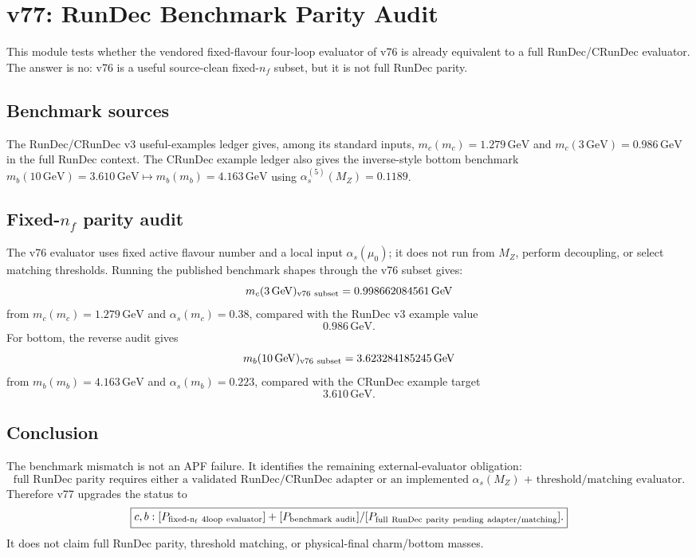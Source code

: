 
\section{v77: RunDec Benchmark Parity Audit}
\label{sec:v77-rundec-benchmark-parity}

This module tests whether the vendored fixed-flavour four-loop evaluator of v76 is already equivalent to a full RunDec/CRunDec evaluator.  The answer is no: v76 is a useful source-clean fixed-$n_f$ subset, but it is not full RunDec parity.

\subsection{Benchmark sources}
The RunDec/CRunDec v3 useful-examples ledger gives, among its standard inputs, $m_c(m_c)=1.279\,\mathrm{GeV}$ and $m_c(3\,\mathrm{GeV})=0.986\,\mathrm{GeV}$ in the full RunDec context.  The CRunDec example ledger also gives the inverse-style bottom benchmark $m_b(10\,\mathrm{GeV})=3.610\,\mathrm{GeV}\mapsto m_b(m_b)=4.163\,\mathrm{GeV}$ using $\alpha_s^{(5)}(M_Z)=0.1189$.

\subsection{Fixed-$n_f$ parity audit}
The v76 evaluator uses fixed active flavour number and a local input $\alpha_s(\mu_0)$; it does not run from $M_Z$, perform decoupling, or select matching thresholds.  Running the published benchmark shapes through the v76 subset gives:
\[
  m_c(3\,\mathrm{GeV})_{\rm v76\ subset}=0.998662084561\,\mathrm{GeV}
\]
from $m_c(m_c)=1.279\,\mathrm{GeV}$ and $\alpha_s(m_c)=0.38$, compared with the RunDec v3 example value
\[
  0.986\,\mathrm{GeV}.
\]
For bottom, the reverse audit gives
\[
  m_b(10\,\mathrm{GeV})_{\rm v76\ subset}=3.623284185245\,\mathrm{GeV}
\]
from $m_b(m_b)=4.163\,\mathrm{GeV}$ and $\alpha_s(m_b)=0.223$, compared with the CRunDec example target
\[
  3.610\,\mathrm{GeV}.
\]

\subsection{Conclusion}
The benchmark mismatch is not an APF failure.  It identifies the remaining external-evaluator obligation:
\[
\boxed{
\text{full RunDec parity requires either a validated RunDec/CRunDec adapter or an implemented }\alpha_s(M_Z)\text{ + threshold/matching evaluator.}
}
\]
Therefore v77 upgrades the status to
\[
\boxed{
 c,b:[P_{\rm fixed\text{-}n_f\ 4loop\ evaluator}]
 +[P_{\rm benchmark\ audit}]
 /[P_{\rm full\ RunDec\ parity\ pending\ adapter/matching}].
}
\]
It does not claim full RunDec parity, threshold matching, or physical-final charm/bottom masses.
